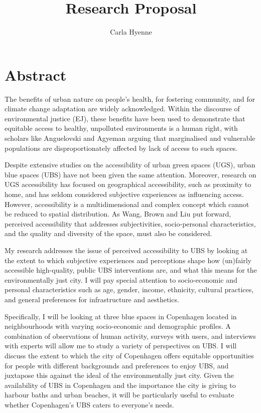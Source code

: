 \documentclass{article}
\title{Research Proposal}
\author{Carla Hyenne}
\date{}
\begin{document}
\maketitle

\tableofcontents 

\pagebreak
\section{Abstract}

The benefits of urban nature on people’s health, for fostering community, and for climate change adaptation are widely acknowledged. Within the discourse of environmental justice (EJ), these benefits have been used to demonstrate that equitable access to healthy, unpolluted environments is a human right, with scholars like Anguelovski and Agyeman arguing that marginalised and vulnerable populations are disproportionately affected by lack of access to such spaces. 

Despite extensive studies on the accessibility of urban green spaces (UGS), urban blue spaces (UBS) have not been given the same attention. Moreover, research on UGS accessibility has focused on geographical accessibility, such as proximity to home, and has seldom considered subjective experiences as influencing access. However, accessibility is a multidimensional and complex concept which cannot be reduced to spatial distribution. As Wang, Brown and Liu put forward, perceived accessibility that addresses subjectivities, socio-personal characteristics, and the quality and diversity of the space, must also be considered.

My research addresses the issue of perceived accessibility to UBS by looking at the extent to which subjective experiences and perceptions shape how (un)fairly accessible high-quality, public UBS interventions are, and what this means for the environmentally just city.
I will pay special attention to socio-economic and personal characteristics such as age, gender, income, ethnicity, cultural practices, and general preferences for infrastructure and aesthetics.

Specifically, I will be looking at three blue spaces in Copenhagen located in neighbourhoods with varying socio-economic and demographic profiles. A combination of observations of human activity, surveys with users, and interviews with experts will allow me to study a variety of perspectives on UBS. I will discuss the extent to which the city of Copenhagen offers equitable opportunities for people with different backgrounds and preferences to enjoy UBS, and juxtapose this against the ideal of the environmentally just city. 
Given the availability of UBS in Copenhagen and the importance the city is giving to harbour baths and urban beaches, it will be particularly useful to evaluate whether Copenhagen’s UBS caters to everyone’s needs.
\end{document}

